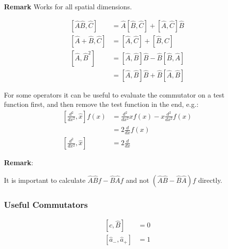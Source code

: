 \textbf{Remark} Works for all spatial dimensions.

\newpar{}

\noindent\begin{align*}
    \left[\widehat{A}\widehat{B},\widehat{C}\right]  & =\widehat{A}\left[\widehat{B},\widehat{C}\right]+\left[\widehat{A},\widehat{C}\right]\widehat{B}     \\
    \left[\widehat{A}+\widehat{B},\widehat{C}\right] & = \left[\widehat{A},\widehat{C}\right]+\left[\widehat{B},\widehat{C}\right]                          \\
    \left[\widehat{A},\widehat{B}^2\right]           & = \left[\widehat{A},\widehat{B}\right] \widehat{B} - \widehat{B}\left[\widehat{B},\widehat{A}\right] \\
                                                     & = \left[\widehat{A},\widehat{B}\right] \widehat{B} + \widehat{B}\left[\widehat{A},\widehat{B}\right]
\end{align*}


For some operators it can be useful to evaluate the commutator on a test function first, and then remove the test function in the end, e.g.:
\noindent\begin{align*}
    \left[\frac{d^2}{dx^2}, \widehat{x}\right] f(x) & = \frac{d^2}{dx^2} xf(x) - x\frac{d^2}{dx^2}f(x) \\
                                                    & = 2\frac{d}{dx} f(x)                             \\
    \left[\frac{d^2}{dx^2}, \widehat{x}\right]      & = 2\frac{d}{dx}
\end{align*}

\textbf{Remark}:

It is important to calculate $\widehat{A}\widehat{B}f - \widehat{B}\widehat{A}f$ and not $(\widehat{A}\widehat{B} - \widehat{B}\widehat{A})f$ directly.

\subsubsection{Useful Commutators}

\noindent\begin{align*}
    \left[c,\hat B\right]                        & =0  \\
    \left[\widehat{a}_{-},\widehat{a}_{+}\right] & = 1 \\
\end{align*}

